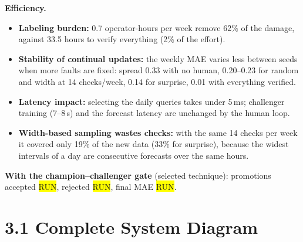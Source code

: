 \documentclass[11pt,letterpaper]{article}
\newcommand{\run}{\colorbox{yellow}{\footnotesize RUN}}
\begin{document}
\textbf{Efficiency.}
\begin{itemize}
  \item \textbf{Labeling burden:} 0.7 operator-hours per week remove 62\% of the damage, against 33.5 hours to
  verify everything (2\% of the effort).
  \item \textbf{Stability of continual updates:} the weekly MAE varies less between seeds when more faults are fixed:
  spread 0.33 with no human, 0.20--0.23 for random and width at 14 checks/week, 0.14 for surprise, 0.01 with
  everything verified.
  \item \textbf{Latency impact:} selecting the daily queries takes under 5\,ms; challenger training (7--8\,s) and the
  forecast latency are unchanged by the human loop.
  \item \textbf{Width-based sampling wastes checks:} with the same 14 checks per week it covered only 19\% of the new
  data (33\% for surprise), because the widest intervals of a day are consecutive forecasts over the same hours.
\end{itemize}
\textbf{With the champion--challenger gate} (selected technique): promotions accepted \run, rejected \run, final MAE
\run.

\section*{3.1 Complete System Diagram}
\end{document}
